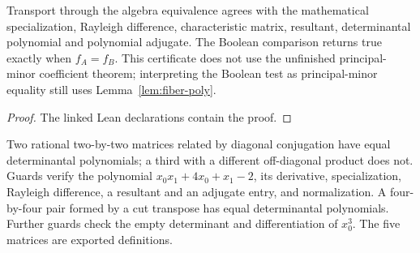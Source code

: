 \begin{lemma}

\label{lem:compute-correct}


\leanok


Transport through the algebra equivalence agrees with the mathematical specialization,
Rayleigh difference, characteristic matrix, resultant, determinantal polynomial and
polynomial adjugate. The Boolean comparison returns true exactly when $f_A=f_B$.
This certificate does not use the unfinished principal-minor coefficient theorem;
interpreting the Boolean test as principal-minor equality still uses
Lemma~\ref{lem:fiber-poly}.

\end{lemma}

\begin{proof}

\leanok

The linked Lean declarations contain the proof.

\end{proof}

\begin{definition}

\label{def:compute-examples}


\leanok


Two rational two-by-two matrices related by diagonal conjugation have equal determinantal
polynomials; a third with a different off-diagonal product does not. Guards verify the
polynomial $x_0x_1+4x_0+x_1-2$, its derivative, specialization, Rayleigh difference,
a resultant and an adjugate entry, and normalization. A four-by-four pair formed by a
cut transpose has equal determinantal polynomials. Further guards check the empty
determinant and differentiation of $x_0^3$. The five matrices are exported definitions.

\end{definition}

